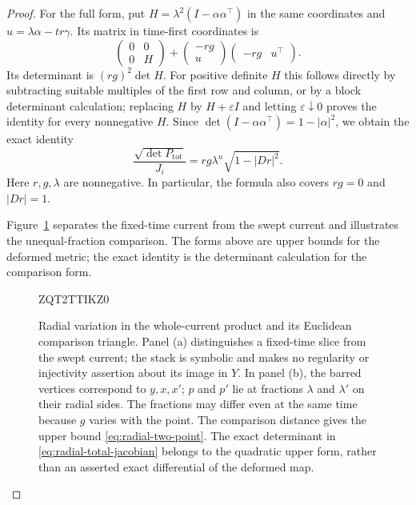 \documentclass[11pt]{article}
\numberwithin{equation}{section}
\theoremstyle{definition}
\theoremstyle{remark}
\begin{document}
\begin{proof}
For the full form, put $H=\lambda^2(I-\alpha\alpha^\top)$ in the
same coordinates and $u=\lambda\alpha-tr\gamma$.  Its matrix in
time-first coordinates is
\[
 \begin{pmatrix}0&0\\0&H\end{pmatrix}
 +\begin{pmatrix}-rg\\u\end{pmatrix}
  \begin{pmatrix}-rg&u^\top\end{pmatrix}.
\]
Its determinant is $(rg)^2\det H$.  For positive definite $H$ this
follows directly by subtracting suitable multiples of the first
row and column, or by a block determinant calculation; replacing
$H$ by $H+\varepsilon I$ and letting $\varepsilon\downarrow0$
proves the identity for every nonnegative $H$.  Since
$\det(I-\alpha\alpha^\top)=1-|\alpha|^2$, we obtain the exact
identity
\begin{equation}
 \frac{\sqrt{\det P_{\mathrm{tot}}}}{J_i}
 =rg\lambda^n\sqrt{1-|Dr|^2}.
 \label{eq:radial-total-jacobian}
\end{equation}
Here $r,g,\lambda$ are nonnegative.  In particular, the formula
also covers $rg=0$ and $|Dr|=1$.

Figure~\ref{fig:radial-variation} separates the fixed-time current
from the swept current and illustrates the unequal-fraction comparison.
The forms above are upper bounds for the deformed metric; the exact
identity is the determinant calculation for the comparison form.
\begin{figure}[htbp]

ZQT2TTIKZ0
\caption{Radial variation in the whole-current product and its Euclidean
comparison triangle. Panel (a) distinguishes a fixed-time slice from
the swept current; the stack is symbolic and makes no regularity or
injectivity assertion about its image in $Y$. In panel (b), the
barred vertices correspond to $y,x,x'$; $p$ and $p'$ lie at fractions
$\lambda$ and $\lambda'$ on their radial sides. The fractions may
differ even at the same time because $g$ varies with the point.
The comparison distance gives the upper bound
\eqref{eq:radial-two-point}. The exact determinant in
\eqref{eq:radial-total-jacobian} belongs to the quadratic upper form,
rather than an asserted exact differential of the deformed map.}
\label{fig:radial-variation}
\end{figure}



\end{proof}
\end{document}
